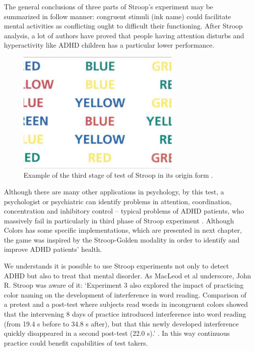 The general conclusions of three parts of Stroop's experiment may be summarized in follow manner: congruent stimuli (ink name) could facilitate mental activities as conflicting ought to difficult their functioning. After Stroop analysis, a lot of authors have proved that people having attention disturbs and hyperactivity like ADHD children has a particular lower performance.

\begin{figure}[htp]
\begin{center}
  \includegraphics[width=8cm]{chapters/adhd/img/stroop.jpeg}
  \caption{Example of the third stage of test of Stroop in its origin form \citep{iStroop}.}
  \label{stroop}
\end{center}
\end{figure}


Although there are many other applications in psychology, by this test, a psychologist or psychiatric can identify problems in attention, coordination, concentration and inhibitory control -- typical problems of ADHD patients, who  massively fail in particularly in third phase of Stroop experiment \citep{lansbergen}. Although Colors has some specific implementations, which are presented in next chapter, the game was inspired by the Stroop-Golden modality in order to identify and improve ADHD patients' health.

We understands it is possible to use Stroop experiments not only to detect ADHD but also to treat that mental disorder. As MacLeod et al underscore,  John R. Stroop was aware of it: `Experiment 3 also explored the impact of practicing color naming on the development of interference in word reading.  Comparison of a pretest and a post-test where subjects read words in incongruent colors showed that the intervening 8 days of practice introduced interference into word reading (from 19.4 s before to 34.8 s after), but that this newly developed interference quickly disappeared in a second post-test (22.0 s).' \citep{macleod}. In this way continuous practice could benefit capabilities of test takers.

